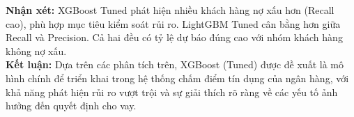\textbf{Nhận xét:} XGBoost Tuned phát hiện nhiều khách hàng nợ xấu hơn (Recall cao), phù hợp mục tiêu kiểm soát rủi ro. LightGBM Tuned cân bằng hơn giữa Recall và Precision. Cả hai đều có tỷ lệ dự báo đúng cao với nhóm khách hàng không nợ xấu. \\
\textbf{Kết luận:} Dựa trên các phân tích trên, XGBoost (Tuned) được đề xuất là mô hình chính để triển khai trong hệ thống chấm điểm tín dụng của ngân hàng, với khả năng phát hiện rủi ro vượt trội và sự giải thích rõ ràng về các yếu tố ảnh hưởng đến quyết định cho vay.
